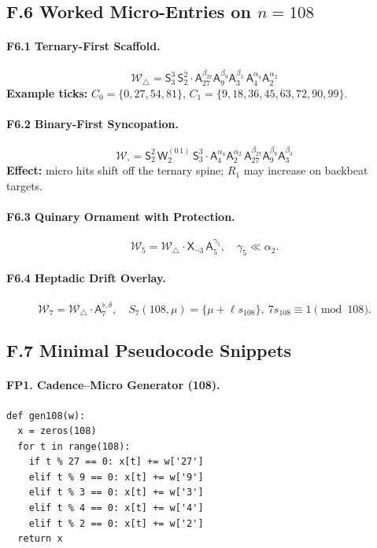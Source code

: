 \documentclass[12pt]{article}
\numberwithin{equation}{section}
\theoremstyle{plain}
\theoremstyle{definition}
\theoremstyle{remark}
\begin{document}
\subsection*{F.6 Worked Micro-Entries on $n=108$}
\paragraph{F6.1 Ternary-First Scaffold.}
\[
\boxed{\mathcal{W}_{\triangle}=\mathsf{S}_3^3\,\mathsf{S}_2^2\cdot
\mathsf{A}_{27}^{\beta_{27}}\mathsf{A}_{9}^{\beta_9}\mathsf{A}_{3}^{\beta_3}\,
\mathsf{A}_{4}^{\alpha_4}\mathsf{A}_{2}^{\alpha_2}}
\]
\textbf{Example ticks:} $C_0=\{0,27,54,81\}$, $C_1=\{9,18,36,45,63,72,90,99\}$.

\paragraph{F6.2 Binary-First Syncopation.}
\[
\boxed{\mathcal{W}_{\square}=\mathsf{S}_2^2\,\mathsf{W}_2^{(0\,1)}\,\mathsf{S}_3^3\cdot
\mathsf{A}_{4}^{\alpha_4}\mathsf{A}_{2}^{\alpha_2}\,
\mathsf{A}_{27}^{\beta_{27}}\mathsf{A}_{9}^{\beta_9}\mathsf{A}_{3}^{\beta_3}}
\]
\textbf{Effect:} micro hits shift off the ternary spine; $R_1$ may increase on backbeat targets.

\paragraph{F6.3 Quinary Ornament with Protection.}
\[
\mathcal{W}_{5}=\mathcal{W}_{\triangle}\cdot \mathsf{X}_{\neg 3}\,\mathsf{A}_5^{\gamma_5},
\quad \gamma_5\ll \alpha_2.
\]

\paragraph{F6.4 Heptadic Drift Overlay.}
\[
\mathcal{W}_{7}=\mathcal{W}_{\triangle}\cdot \mathsf{A}_7^{\flat,\delta},
\quad S_7(108,\mu)=\{\mu+\ell s_{108}\},\ 7s_{108}\equiv1\pmod{108}.
\]

\subsection*{F.7 Minimal Pseudocode Snippets}
\paragraph{FP1. Cadence–Micro Generator (108).}
\begin{verbatim}
def gen108(w):
  x = zeros(108)
  for t in range(108):
    if t % 27 == 0: x[t] += w['27']
    elif t % 9 == 0: x[t] += w['9']
    elif t % 3 == 0: x[t] += w['3']
    elif t % 4 == 0: x[t] += w['4']
    elif t % 2 == 0: x[t] += w['2']
  return x
\end{verbatim}
\end{document}
